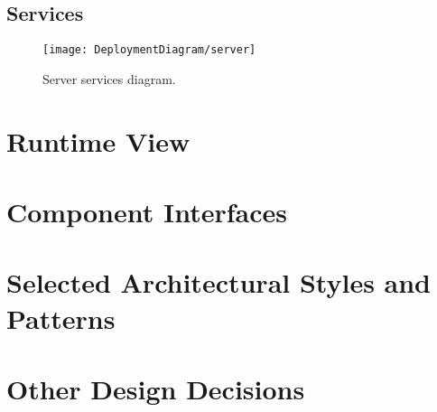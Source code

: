 \subsection{Services}
\label{subsec:services}%
\begin{figure} [H]
    \begin{center}
        \texttt{[image: DeploymentDiagram/server]}
        \caption{Server services diagram.}
        \label{fig: services}
    \end{center}
\end{figure}



\section{Runtime View}
\label{sec: runtime_view}%


\section{Component Interfaces}
\label{sec: component_interfaces}%


\section{Selected Architectural Styles and Patterns}
\label{sec: patterns}%


\section{Other Design Decisions}
\label{sec: other_design_decisions}%
